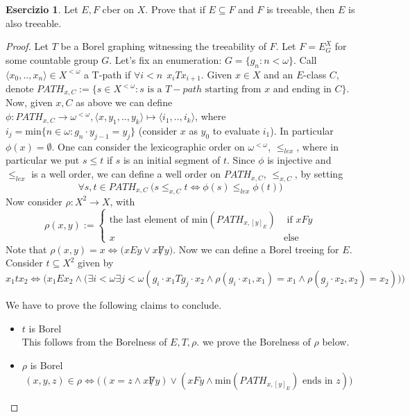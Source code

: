 \documentclass[a4paper,12pt]{article}
\theoremstyle{plain}
\theoremstyle{definition}
\newtheorem{esercizio}{Esercizio}
\theoremstyle{remark}
\begin{document}
\begin{esercizio}
	Let $E,F$ cber on $X$. Prove that if $E \subseteq F$ and $F$ is treeable, then $E$ is also treeable.
\end{esercizio}

\begin{proof}
	Let $T$ be a Borel graphing witnessing the treeability of $F$.
	Let $F = E_{G}^{X}$ for some countable group $G$. 
	Let's fix an enumeration: $G = \{g_n : n < \omega \}$.
	Call $\langle x_0,..,x_n \rangle \in X^{< \omega}$ a T-path if $\forall i<n \ \ x_i T x_{i+1}$.
	Given $x \in X$ and an $E$-class $C$, denote $PATH_{x,C} := \{s \in X^{< \omega} : s\text{ is a }T-path\text{ starting from }x 
	\text{ and ending in }C\}$.
	Now, given $x,C$ as above we can define
	$\phi: PATH_{x,C} \to \omega^{< \omega}, \langle x, y_1, .., y_k\rangle \mapsto \langle i_1,..,i_k \rangle$, where 
	$i_j = \text{min}\{n \in \omega : g_n \cdot y_{j-1} = y_j\}$ (consider $x$ as $y_0$ to evaluate $i_1$).
	In particular $\phi(x) = \emptyset$.
	One can consider the lexicographic order on $\omega ^{< \omega}$, $\leq_{lex}$, 
	where in particular we put $s \leq t$ if $s$ is an initial segment of $t$.
	Since $\phi$ is injective and $\leq_{lex}$ is a well order, we can define a well order on $PATH_{x,C}$, $\leq_{x,C}$, by setting
	\[
		\forall s,t \in PATH_{x,C} \ \big(s \leq_{x,C} t \iff \phi(s) \leq_{lex} \phi(t) \big)
	\]
	Now consider $\rho: X^2 \to X$, with 
	\[
	\rho(x,y) :=
	\begin{cases}
		\text{the last element of min}(PATH_{x,[y]_E}) & \text{ if } x F y   \\
		x & \text{else}
	\end{cases}
	\]
	Note that $\rho(x,y) = x \iff \bigg( x E y \lor x \not F y\bigg)$.
	Now we can define a Borel treeing for $E$.
	Consider $t \subseteq X^2$ given by
	\[
		x_1 t x_2 \iff 
		\bigg( x_1 E x_2 \land 
		\big(\exists i < \omega \exists j < \omega 
		(g_i \cdot x_1 T g_j \cdot x_2 \land \rho(g_i \cdot x_1,x_1) = x_1 \land \rho(g_j \cdot x_2,x_2) = x_2)
		\big) \bigg)
	\]

	We have to prove the following claims to conclude.
	\begin{itemize}
		\item $t$ is Borel \\
			This follows from the Borelness of $E,T,\rho$. we prove the Borelness of $\rho$ below.
		\item $\rho$ is Borel \\
			\[
				(x,y,z) \in \rho \iff 
				\bigg( (x = z \land x \not F y) \lor (x F y \land \text{min}(PATH_{x,[y]_E}) \text{ ends in }z )\bigg)
			\]


\end{itemize}
\end{proof}
\end{document}

